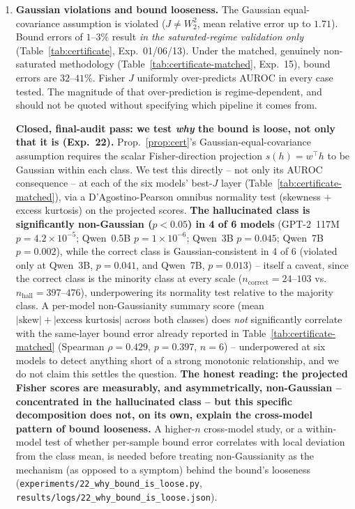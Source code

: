 \documentclass[10pt,twocolumn]{article}
\begin{document}
\begin{enumerate}[leftmargin=*, topsep=2pt, itemsep=2pt]
\item \textbf{Gaussian violations and bound looseness.} The Gaussian
  equal-covariance assumption is violated ($J \neq W_2^2$, mean relative
  error up to $1.71$). Bound errors of $1$--$3\%$ result \emph{in the
  saturated-regime validation only} (Table~\ref{tab:certificate},
  Exp.~01/06/13). Under the matched, genuinely non-saturated methodology
  (Table~\ref{tab:certificate-matched}, Exp.~15), bound errors are
  $32$--$41\%$. Fisher $J$ uniformly over-predicts AUROC in every case
  tested. The magnitude of that over-prediction is regime-dependent, and
  should not be quoted without specifying which pipeline it comes from.

  \textbf{Closed, final-audit pass: we test \emph{why} the bound is
  loose, not only that it is (Exp.~22).} Prop.~\ref{prop:cert}'s
  Gaussian-equal-covariance assumption requires the scalar Fisher-direction
  projection $s(h) = w^\top h$ to be Gaussian within each class. We test
  this directly -- not only its AUROC consequence -- at each of the six
  models' best-$J$ layer (Table~\ref{tab:certificate-matched}), via a
  D'Agostino-Pearson omnibus normality test (skewness $+$ excess kurtosis)
  on the projected scores. \textbf{The hallucinated class is significantly
  non-Gaussian ($p<0.05$) in 4 of 6 models} (GPT-2~117M $p{=}4.2\times10^{-5}$;
  Qwen~0.5B $p{=}1\times10^{-6}$; Qwen~3B $p{=}0.045$; Qwen~7B
  $p{=}0.002$), while the correct class is Gaussian-consistent in 4 of 6
  (violated only at Qwen~3B, $p{=}0.041$, and Qwen~7B, $p{=}0.013$) --
  itself a caveat, since the correct class is the minority class at every
  scale ($n_{\text{correct}}=24$--$103$ vs.\ $n_{\text{hall}}=397$--$476$),
  underpowering its normality test relative to the majority class. A
  per-model non-Gaussianity summary score (mean $|{\text{skew}}|+|{\text{excess
  kurtosis}}|$ across both classes) does \emph{not} significantly
  correlate with the same-layer bound error already reported in
  Table~\ref{tab:certificate-matched} (Spearman $\rho=0.429$, $p=0.397$,
  $n=6$) -- underpowered at six models to detect anything short of a
  strong monotonic relationship, and we do not claim this settles the
  question. \textbf{The honest reading: the projected Fisher scores are
  measurably, and asymmetrically, non-Gaussian -- concentrated in the
  hallucinated class -- but this specific decomposition does not, on its
  own, explain the cross-model pattern of bound looseness.} A higher-$n$
  cross-model study, or a within-model test of whether per-sample
  bound error correlates with local deviation from the class mean, is
  needed before treating non-Gaussianity as the mechanism (as opposed to
  a symptom) behind the bound's looseness (\texttt{experiments/22\_why\_bound\_is\_loose.py},
  \texttt{results/logs/22\_why\_bound\_is\_loose.json}).


\end{enumerate}
\end{document}
